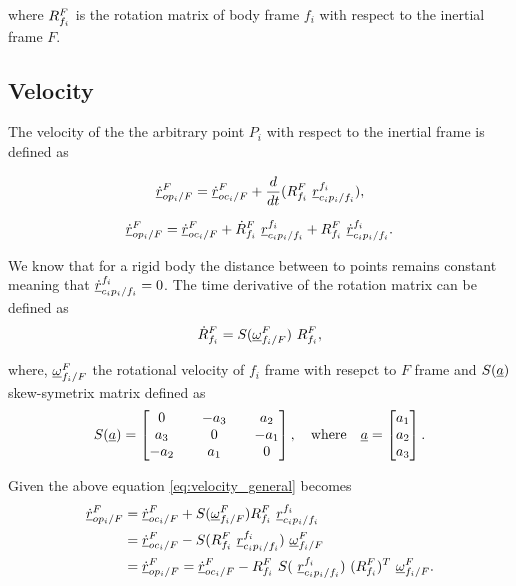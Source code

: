 where $\rot{R}{f_{i}}{F}$ is the rotation matrix of body frame $f_{i}$ with respect to 
the inertial frame $F$.

\subsection{Velocity}
The velocity of the the arbitrary point $P_{i}$ with respect to the inertial frame 
is defined as

\[
    \pvec{\dot{r}}{op_{i}}{F}{F} = \pvec{\dot{r}}{oc_{i}}{F}{F} + 
    \frac{d}{dt}(\rot{R}{f_{i}}{F} \  \pvec{r}{c_{i}p_{i}}{f_i}{f_i}),
\]

\begin{equation}
    \pvec{\dot{r}}{op_{i}}{F}{F} = \pvec{\dot{r}}{oc_{i}}{F}{F} + 
    \rot{\dot{R}}{f_{i}}{F} \  \pvec{r}{c_{i}p_{i}}{f_i}{f_i} + 
    \rot{R}{f_{i}}{F} \  \pvec{\dot{r}}{c_{i}p_{i}}{f_i}{f_i}.
    \label{eq:velocity_general}
\end{equation}

We know that for a rigid body the distance between to points remains constant 
meaning that $\pvec{\dot{r}}{c_{i}p_{i}}{f_i}{f_i} = 0$. The time derivative of 
the rotation matrix can be defined as 
\begin{equation}
    \rot{\dot{R}}{f_{i}}{F} = S(\pvec{\omega}{f_{i}}{F}{F}) \ \rot{R}{f_{i}}{F},
    \label{eq:rot_mat_derivative}
\end{equation}

where, $\pvec{\omega}{f_{i}}{F}{F}$ the rotational velocity of $f_{i}$ frame 
with resepct to $F$ frame and $S(\vecd{a})$ skew-symetrix matrix defined as 
\[
    S(\vecd{a}) = \begin{bmatrix}
        0 && -a_{3} && a_{2} \\
        a_{3} && 0 && -a_{1} \\ 
        -a_{2} && a_{1} && 0 \\ 
    \end{bmatrix}, \quad \text{where} \quad \vecd{a} = \begin{bmatrix}
        a_{1} \\ a_{2} \\ a_{3}
    \end{bmatrix}.
\]

Given the above equation \eqref{eq:velocity_general} becomes
\begin{align*}
    \pvec{\dot{r}}{op_{i}}{F}{F} 
    & = \pvec{\dot{r}}{oc_{i}}{F}{F} + 
    S(\pvec{\omega}{f_{i}}{F}{F}) \rot{R}{f_{i}}{F} \ \pvec{r}{c_{i}p_{i}}{f_i}{f_i} \\
    & = \pvec{\dot{r}}{oc_{i}}{F}{F} - S(\rot{R}{f_{i}}{F} \ \pvec{r}{c_{i}p_{i}}{f_i}{f_i}) \ \pvec{\omega}{f_{i}}{F}{F} \\ 
    & = \pvec{\dot{r}}{op_{i}}{F}{F} = \pvec{\dot{r}}{oc_{i}}{F}{F} -
    \rot{R}{f_{i}}{F} \ S( \ \pvec{r}{c_{i}p_{i}}{f_i}{f_i}) \ (\rot{R}{f_{i}}{F})^{T} \ \pvec{\omega}{f_{i}}{F}{F}.  
\end{align*}

